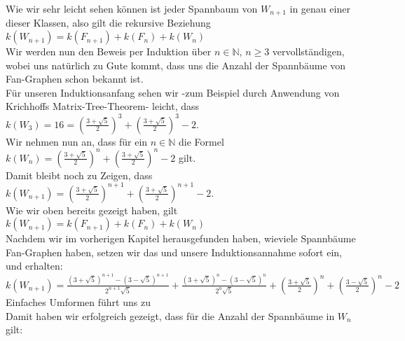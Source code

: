 Wie wir sehr leicht sehen können ist jeder Spannbaum von $W_{n+1}$ in genau einer dieser Klassen, also gilt die rekursive Beziehung
$\mathit{k}(W_{n+1}) = \mathit{k}(F_{n+1}) + \mathit{k}(F_n) + \mathit{k}(W_n)$\\
Wir werden nun den Beweis per Induktion über $n \in \mathbb{N}, \, n \geq 3$ vervollständigen, wobei uns natürlich zu Gute kommt, dass uns die Anzahl der Spannbäume von Fan-Graphen schon bekannt ist.\\
Für unseren Induktionsanfang sehen wir -zum Beispiel durch Anwendung von Krichhoffs Matrix-Tree-Theorem- leicht, dass $\mathit{k}(W_3) = 16 = (\frac{3+\sqrt{5}}{2})^3+(\frac{3+\sqrt{5}}{2})^3-2$.\\
Wir nehmen nun an, dass für ein $n \in \mathbb{N}$ die Formel $\mathit{k}(W_n) = (\frac{3+\sqrt{5}}{2})^n+(\frac{3+\sqrt{5}}{2})^n-2$ gilt.\\
Damit bleibt noch zu Zeigen, dass  $\mathit{k}(W_{n+1}) = (\frac{3+\sqrt{5}}{2})^{n+1}+(\frac{3+\sqrt{5}}{2})^{n+1}-2$.\\
Wie wir oben bereits gezeigt haben, gilt
$\mathit{k}(W_{n+1}) = \mathit{k}(F_{n+1}) + \mathit{k}(F_n) + \mathit{k}(W_n)$\\
Nachdem wir im vorherigen Kapitel herausgefunden haben, wieviele Spannbäume Fan-Graphen haben, setzen wir das und unsere Induktionsannahme sofort ein, und erhalten:\\
$\mathit{k}(W_{n+1}) = \frac{(3+\sqrt{5})^{n+1}-(3-\sqrt{5})^{n+1}}{2^{n+1}\sqrt{5}} + \frac{(3+\sqrt{5})^{n}-(3-\sqrt{5})^{n}}{2^{n}\sqrt{5}} + (\frac{3+\sqrt{5}}{2})^n+(\frac{3-\sqrt{5}}{2})^n-2$\\%
Einfaches Umformen führt uns zu\\

Damit haben wir erfolgreich gezeigt, dass für die Anzahl der Spannbäume in $W_n$ gilt:\\


